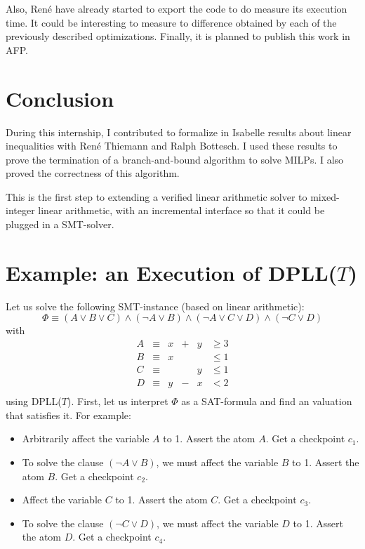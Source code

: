 \documentclass{article}
\begin{document}
Also, René have already started to export the code to do measure its execution
time. It could be interesting to measure to difference obtained by each of the
previously described optimizations. Finally, it is planned to publish this
work in AFP.

\section*{Conclusion}
During this internship, I contributed to formalize in Isabelle results about
linear inequalities with René Thiemann and Ralph Bottesch. I used these results
to prove the termination of a branch-and-bound algorithm to solve MILPs. I also
proved the correctness of this algorithm.

This is the first step to extending a verified linear arithmetic solver to
mixed-integer linear arithmetic, with an incremental interface so that it could
be plugged in a SMT-solver.




\appendix

\section{Example: an Execution of DPLL($T$)}
\label{dpll}
Let us solve the following SMT-instance (based on linear arithmetic):
$$\Phi \equiv (A \vee B \vee C) \wedge (\neg A \vee B) \wedge
              (\neg A \vee C \vee D) \wedge (\neg C \vee D)$$
with
\begin{displaymath}
\begin{array}{lccccl}
  A & \equiv & x & + & y & \geqslant 3 \\
  B & \equiv & x &   &   & \leqslant 1 \\
  C & \equiv &   &   & y & \leqslant 1 \\
  D & \equiv & y & - & x & < 2         \\
\end{array}
\end{displaymath}
using DPLL($T$). First, let us interpret $\Phi$ as a SAT-formula and find an
valuation that satisfies it. For example:
\begin{itemize}
  \item Arbitrarily affect the variable $A$ to 1. Assert the atom $A$. Get a
    checkpoint $c_1$.
  \item To solve the clause $(\neg A \vee B)$, we must affect the variable $B$
    to 1. Assert the atom $B$. Get a checkpoint $c_2$.
  \item Affect the variable $C$ to 1. Assert the atom $C$. Get a checkpoint
    $c_3$.
  \item To solve the clause $(\neg C \vee D)$, we must affect the variable $D$
    to 1. Assert the atom $D$. Get a checkpoint $c_4$.
\end{itemize}
\end{document}
